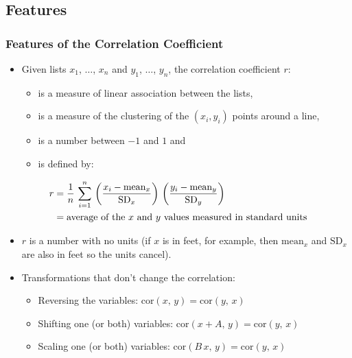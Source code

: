 \documentclass[t]{beamer}
\begin{document}
\subsection{Features}
\begin{frame}[t]\frametitle{Features of the Correlation Coefficient}
{\small
\begin{itemize}
\item Given lists $x_1$, $\dots$, $x_n$ and $y_1$, $\dots$, $y_n$, the correlation
  coefficient $r$:
  \begin{itemize} 
     \item \footnotesize  is a measure of linear association between the lists,
     \item \footnotesize  is a measure of the clustering of the $(x_i, y_i)$ points around a line,
     \item \footnotesize  is a number between $-1$ and $1$ and
     \item \footnotesize  is defined by:\vspace{-10pt}
   \end{itemize}
\end{itemize}
\begin{align*}
r &=\frac{1}{n}\,\sum_{i=1}^n\,\left(\frac{x_i - \mbox{mean}_x}{\mbox{SD}_x}\right)\,
  \left(\frac{y_i - \mbox{mean}_y}{\mbox{SD}_y}\right)\\
  &= \mbox{average of the $x$ and $y$ values measured in standard units}\vspace{-20pt}
\end{align*}\vspace{-15pt}
\begin{itemize}
\item $r$ is a number with no units (if $x$ is in feet, for example, then $\mbox{mean}_x$ and
   $\mbox{SD}_x$ are also in feet so the units cancel).
\item Transformations that don't change the correlation:
   \begin{itemize}
   \item \footnotesize Reversing the variables: $\mbox{cor}(x,\,y) = \mbox{cor}(y,\,x)$
   \item \footnotesize  Shifting one (or both) variables: $\mbox{cor}(x + A,\,y) = \mbox{cor}(y,\,x)$
   \item \footnotesize  Scaling one (or both) variables: $\mbox{cor}(B\,x,\,y) = \mbox{cor}(y,\,x)$
   \end{itemize}
\end{itemize}

}
\end{frame}
\end{document}
